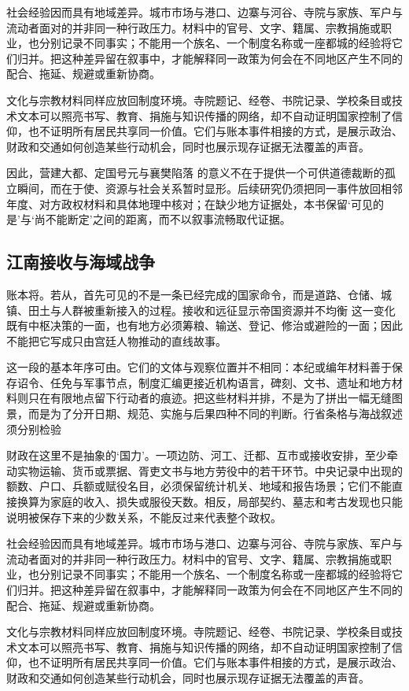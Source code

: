 社会经验因而具有地域差异。城市市场与港口、边寨与河谷、寺院与家族、军户与流动者面对的并非同一种行政压力。材料中的官号、文字、籍属、宗教捐施或职业，也分别记录不同事实；不能用一个族名、一个制度名称或一座都城的经验将它们归并。把这种差异留在叙事中，才能解释同一政策为何会在不同地区产生不同的配合、拖延、规避或重新协商。

文化与宗教材料同样应放回制度环境。寺院题记、经卷、书院记录、学校条目或技术文本可以照亮书写、教育、捐施与知识传播的网络，却不自动证明国家控制了信仰，也不证明所有居民共享同一价值。它们与账本事件相接的方式，是展示政治、财政和交通如何创造某些行动机会，同时也展示现存证据无法覆盖的声音。

因此，营建大都、定国号元与襄樊陷落 的意义不在于提供一个可供道德裁断的孤立瞬间，而在于使、资源与社会关系暂时显形。后续研究仍须把同一事件放回相邻年度、对方政权材料和具体地理中核对；在缺少地方证据处，本书保留‘可见的是’与‘尚不能断定’之间的距离，而不以叙事流畅取代证据。

\subsection{江南接收与海域战争}

账本将。若从，首先可见的不是一条已经完成的国家命令，而是道路、仓储、城镇、田土与人群被重新接入的过程。接收和远征显示帝国资源并不均衡 这一变化既有中枢决策的一面，也有地方必须筹粮、输送、登记、修治或避险的一面；因此不能把它写成只由宫廷人物推动的直线故事。

这一段的基本年序可由。它们的文体与观察位置并不相同：本纪或编年材料善于保存诏令、任免与军事节点，制度汇编更接近机构语言，碑刻、文书、遗址和地方材料则只在有限地点留下行动者的痕迹。把这些材料并排，不是为了拼出一幅无缝图景，而是为了分开日期、规范、实施与后果四种不同的判断。行省条格与海战叙述须分别检验

财政在这里不是抽象的‘国力’。一项边防、河工、迁都、互市或接收安排，至少牵动实物运输、货币或票据、胥吏文书与地方劳役中的若干环节。中央记录中出现的额数、户口、兵额或赋役名目，必须保留统计机关、地域和报告场景；它们不能直接换算为家庭的收入、损失或服役天数。相反，局部契约、墓志和考古发现也只能说明被保存下来的少数关系，不能反过来代表整个政权。

社会经验因而具有地域差异。城市市场与港口、边寨与河谷、寺院与家族、军户与流动者面对的并非同一种行政压力。材料中的官号、文字、籍属、宗教捐施或职业，也分别记录不同事实；不能用一个族名、一个制度名称或一座都城的经验将它们归并。把这种差异留在叙事中，才能解释同一政策为何会在不同地区产生不同的配合、拖延、规避或重新协商。

文化与宗教材料同样应放回制度环境。寺院题记、经卷、书院记录、学校条目或技术文本可以照亮书写、教育、捐施与知识传播的网络，却不自动证明国家控制了信仰，也不证明所有居民共享同一价值。它们与账本事件相接的方式，是展示政治、财政和交通如何创造某些行动机会，同时也展示现存证据无法覆盖的声音。

